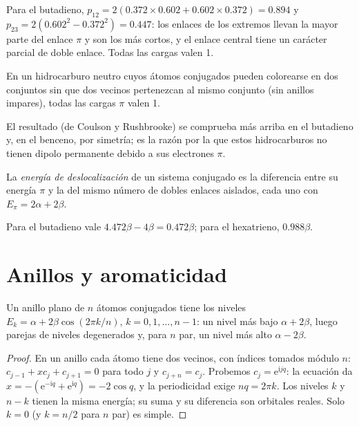 Para el butadieno, $p_{12} = 2(0.372 \times 0.602 + 0.602 \times 0.372) = 0.894$ y $p_{23} =
2(0.602^2 - 0.372^2) = 0.447$: los enlaces de los extremos llevan la mayor parte del enlace $\pi$ y son
los más cortos, y el enlace central tiene un carácter parcial de doble enlace. Todas las cargas valen
1.

\begin{proposition}\label{prop:b2:huckel:alternant}
En un hidrocarburo neutro cuyos átomos conjugados pueden colorearse en dos conjuntos sin
que dos vecinos pertenezcan al mismo conjunto (sin anillos impares), todas las cargas $\pi$ valen 1.
\end{proposition}

\admitted

El resultado (de Coulson y Rushbrooke) se comprueba más arriba en el butadieno y, en el benceno, por
simetría; es la razón por la que estos hidrocarburos no tienen dipolo permanente debido a sus
electrones $\pi$.

\begin{definition}\label{def:b2:huckel:delocalisation}
La \emph{energía de deslocalización} de un sistema
conjugado es la diferencia entre su energía $\pi$ y la del mismo número de
dobles enlaces aislados, cada uno con $E_\pi = 2\alpha + 2\beta$.
\end{definition}

Para el butadieno vale $4.472\beta - 4\beta = 0.472\beta$; para el hexatrieno, $0.988\beta$.

\section{Anillos y aromaticidad}

\begin{theorem}\label{thm:b2:huckel:ring}
Un anillo plano de $n$ átomos conjugados tiene los niveles $E_k = \alpha + 2\beta\cos(2\pi k/n)$,
$k = 0, 1, \dots, n - 1$: un nivel más bajo $\alpha + 2\beta$, luego parejas de niveles
degenerados y, para $n$ par, un nivel más alto $\alpha - 2\beta$.
\end{theorem}

\begin{proof}
En un anillo cada átomo tiene dos vecinos, con índices tomados módulo $n$:
$c_{j-1} + xc_j + c_{j+1} = 0$ para todo $j$ y $c_{j+n} = c_j$. Probemos $c_j = \mathrm e^{\mathrm
i jq}$: la ecuación da $x = -(\mathrm e^{-\mathrm iq} + \mathrm e^{\mathrm iq}) = -2\cos q$,
y la periodicidad exige $nq = 2\pi k$. Los niveles $k$ y $n - k$ tienen la misma
energía; su suma y su diferencia son orbitales reales. Solo $k = 0$ (y $k = n/2$ para
$n$ par) es simple.
\end{proof}

